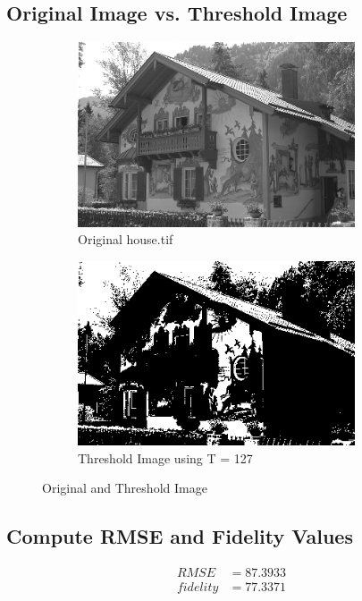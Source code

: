 \documentclass{article}
\begin{document}
\subsection{Original Image vs. Threshold Image}
	\begin{figure}[h]
		\begin{subfigure}{0.5\textwidth}
			\includegraphics[width=0.9\textwidth]{house.png}
			\caption{Original house.tif}
		\end{subfigure}
		\begin{subfigure}{0.5\textwidth}
			\includegraphics[width=0.9\textwidth]{house_t_127.png}
			\caption{Threshold Image using T = 127}
		\end{subfigure}
		\caption{Original and Threshold Image}
	\end{figure}

\subsection{Compute RMSE and Fidelity Values}
	\begin{align*}
		RMSE &= 87.3933 \\
		fidelity &= 77.3371
	\end{align*}
\end{document}
